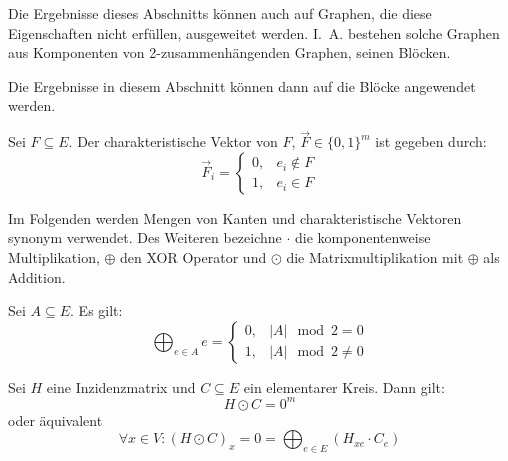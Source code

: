 \begin{remark}
    Die Ergebnisse dieses Abschnitts können auch auf Graphen, die diese Eigenschaften nicht erfüllen, ausgeweitet werden.
    I.~A. bestehen solche Graphen aus Komponenten von 2-zusammenhängenden Graphen, seinen Blöcken.

    Die Ergebnisse in diesem Abschnitt können dann auf die Blöcke angewendet werden.
\end{remark}

\begin{definition}
    Sei $ F \subseteq E $.
    Der charakteristische Vektor von $ F $, $ \vec{F} \in \{ 0, 1 \}^m $ ist gegeben durch:
    \begin{equation*}
        \vec{F}_i = \begin{cases}
            0, & e_i \notin F \\
            1, & e_i \in F
        \end{cases}
    \end{equation*}
\end{definition}

Im Folgenden werden Mengen von Kanten und charakteristische Vektoren synonym verwendet.
Des Weiteren bezeichne $ \cdot $ die komponentenweise Multiplikation, $ \oplus $ den XOR Operator und $ \odot $ die Matrixmultiplikation mit $ \oplus $ als Addition.

\begin{proposition}
    \label{prp:xor-odd-even}
    Sei $ A \subseteq E $.
    Es gilt:
    \begin{equation*}
        \bigoplus_{e \in A} e = \begin{cases}
            0, & |A| \mod 2 = 0 \\
            1, & |A| \mod 2 \ne 0
        \end{cases}
    \end{equation*}
\end{proposition}

\begin{proposition}
    Sei $ H $ eine Inzidenzmatrix und $ C \subseteq E $ ein elementarer Kreis.
    Dann gilt:
    \begin{equation*}
        H \odot C = 0^m
    \end{equation*}
    oder äquivalent
    \begin{equation*}
        \forall x \in V: (H \odot C)_x = 0 = \bigoplus_{e \in E} (H_{xe} \cdot C_e)
    \end{equation*}
\end{proposition}

